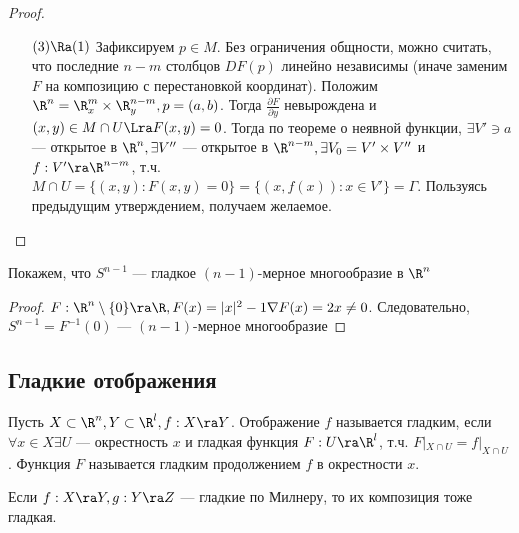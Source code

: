 \begin{proof}
\begin{enumerate}
        \item[\((3) \Ra (1)\)] Зафиксируем \(p \in M\). Без ограничения общности, можно считать, что последние \(n - m\) столбцов \(DF(p)\) линейно независимы (иначе заменим \(F\) на композицию с перестановкой координат). Положим \(\R^n = \R^m_x \times \R^{n - m}_y, p = (a, b)\). Тогда \(\frac{\partial F}{\partial y}\) невырождена и \((x, y) \in M \cap U \Lra F(x, y) = 0\). Тогда по теореме о неявной функции, \(\exists V' \ni a\) --- открытое в \(\R^n, \exists V''\) --- открытое в \(\R^{n - m}, \exists V_0 = V' \times V''\) и \(f: V' \ra \R^{n - m}\), т.ч. \(M \cap U = \{(x, y): F(x, y) = 0\} = \{(x, f(x)): x \in V'\} = \Gamma\). Пользуясь предыдущим утверждением, получаем желаемое.
    \end{enumerate}
\end{proof}

\begin{example}
    Покажем, что \(S^{n - 1}\) --- гладкое \((n-1)\)-мерное многообразие в \(\R^n\)
\end{example}
\begin{proof}
    \(F: \R^n \setminus \{0\} \ra \R, F(x) = |x|^2 - 1 \nabla F(x) = 2x \ne 0\). Следовательно, \(S^{n - 1} = F^{-1}(0)\) --- \((n-1)\)-мерное многообразие
\end{proof}

\subsection{Гладкие отображения}
\begin{definition}
    Пусть \(X \subset \R^n, Y \subset \R^l, f: X \ra Y\). Отображение \(f\) называется гладким, если \(\forall x \in X \exists U\) --- окрестность \(x\) и гладкая функция \(F: U \ra \R^l\), т.ч. \(F|_{X \cap U} = f|_{X \cap U}\). Функция \(F\) называется гладким продолжением \(f\) в окрестности \(x\).
\end{definition}

\begin{note}
    Если \(f: X \ra Y, g: Y \ra Z\) --- гладкие по Милнеру, то их композиция тоже гладкая.
\end{note}

